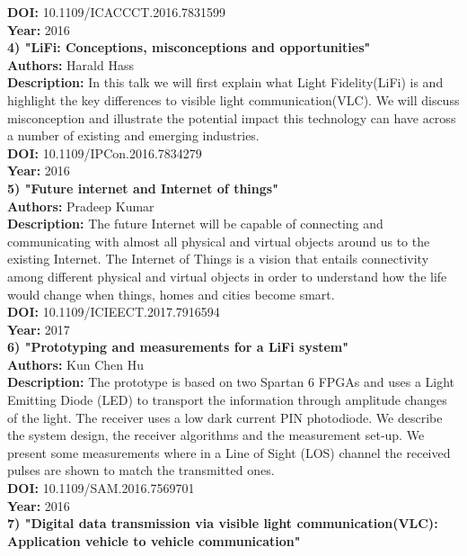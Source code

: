 \documentclass[12pt]{report}	%
\begin{document}
{{{{{{{{{{\textbf{DOI: }10.1109/ICACCCT.2016.7831599\\
\textbf{Year: }2016\\
\newline \textbf{4)  "LiFi: Conceptions, misconceptions and opportunities"}\\
\textbf{Authors: }Harald Hass\\
\textbf{Description: }In this talk we will first explain what Light Fidelity(LiFi) is and highlight the key differences to visible light communication(VLC). We will discuss misconception and illustrate the potential impact this technology can have across a number of existing and emerging industries.\\
\textbf{DOI: }10.1109/IPCon.2016.7834279\\
\textbf{Year: }2016\\
\newline \textbf{5)  "Future internet and Internet of things"}\\
\textbf{Authors: }Pradeep Kumar\\
\textbf{Description: }The future Internet will be capable of connecting and communicating with almost all physical and virtual objects around us to the existing Internet. The Internet of Things is a vision that entails connectivity among different physical and virtual objects in order to understand how the life would change when things, homes and cities become smart.\\
\textbf{DOI: }10.1109/ICIEECT.2017.7916594\\
\textbf{Year: }2017\\
\newline \textbf{6) "Prototyping and measurements for a LiFi system"}\\
\textbf{Authors: }Kun Chen Hu\\
\textbf{Description: }The prototype is based on two Spartan 6 FPGAs and uses a Light Emitting Diode (LED) to transport the information through amplitude changes of the light. The receiver uses a low dark current PIN photodiode. We describe the system design, the receiver algorithms and the measurement set-up. We present some measurements where in a Line of Sight (LOS) channel the received pulses are shown to match the transmitted ones.\\
\textbf{DOI: }10.1109/SAM.2016.7569701\\
\textbf{Year: }2016\\
\newline \textbf{7) "Digital data transmission via visible light communication(VLC): Application vehicle to vehicle communication"}\\
}}}}}}}}}}
\end{document}
